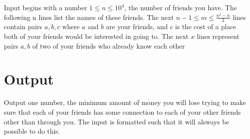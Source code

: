 Input begins with a number $1 \leq n \leq 10^4$, the number of friends you have. The following n lines list the names of these friends. The next $n-1\leq m \leq \frac{n^2-n}{2}$ lines contain pairs $a,b,c$ where $a$ and $b$ are your friends, and $c$ is the cost of a place both of your friends would be interested in going to. The next $x$ lines represent pairs $a,b$ of two of your friends who already know each other

\section*{Output}

Output one number, the minimum amount of money you will lose trying to make sure that each of your friends has some connection to each of your other friends other than through you. The input is formatted such that it will alsways be possible to do this.
